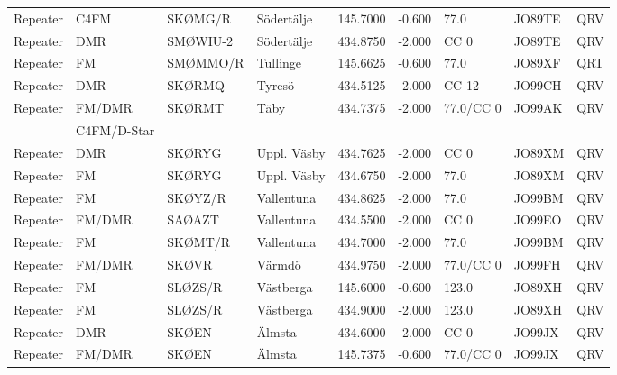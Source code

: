 \begin{landscape}
\begin{longtable}{llllrrlll}
Repeater & C4FM        & SKØMG/R  & Södertälje  & 145.7000     & -0.600     & 77.0       & JO89TE      & QRV      \\
Repeater & DMR         & SMØWIU-2 & Södertälje  & 434.8750     & -2.000     & CC 0       & JO89TE      & QRV      \\
Repeater & FM          & SMØMMO/R & Tullinge    & 145.6625     & -0.600     & 77.0       & JO89XF      & QRT      \\
Repeater & DMR         & SKØRMQ   & Tyresö      & 434.5125     & -2.000     & CC 12      & JO99CH      & QRV      \\
Repeater & FM/DMR      & SKØRMT   & Täby        & 434.7375     & -2.000     & 77.0/CC 0  & JO99AK      & QRV      \\
         & C4FM/D-Star &          &             &              &            &            &             &          \\
Repeater & DMR         & SKØRYG   & Uppl. Väsby & 434.7625     & -2.000     & CC 0       & JO89XM      & QRV      \\
Repeater & FM          & SKØRYG   & Uppl. Väsby & 434.6750     & -2.000     & 77.0       & JO89XM      & QRV      \\
Repeater & FM          & SKØYZ/R  & Vallentuna  & 434.8625     & -2.000     & 77.0       & JO99BM      & QRV      \\
Repeater & FM/DMR      & SAØAZT   & Vallentuna  & 434.5500     & -2.000     & CC 0       & JO99EO      & QRV      \\
Repeater & FM          & SKØMT/R  & Vallentuna  & 434.7000     & -2.000     & 77.0       & JO99BM      & QRV      \\
Repeater & FM/DMR      & SKØVR    & Värmdö      & 434.9750     & -2.000     & 77.0/CC 0  & JO99FH      & QRV      \\
Repeater & FM          & SLØZS/R  & Västberga   & 145.6000     & -0.600     & 123.0      & JO89XH      & QRV      \\
Repeater & FM          & SLØZS/R  & Västberga   & 434.9000     & -2.000     & 123.0      & JO89XH      & QRV      \\
Repeater & DMR         & SKØEN    & Älmsta      & 434.6000     & -2.000     & CC 0       & JO99JX      & QRV      \\
Repeater & FM/DMR      & SKØEN    & Älmsta      & 145.7375     & -0.600     & 77.0/CC 0  & JO99JX      & QRV      \\
\end{longtable}



\end{landscape}
